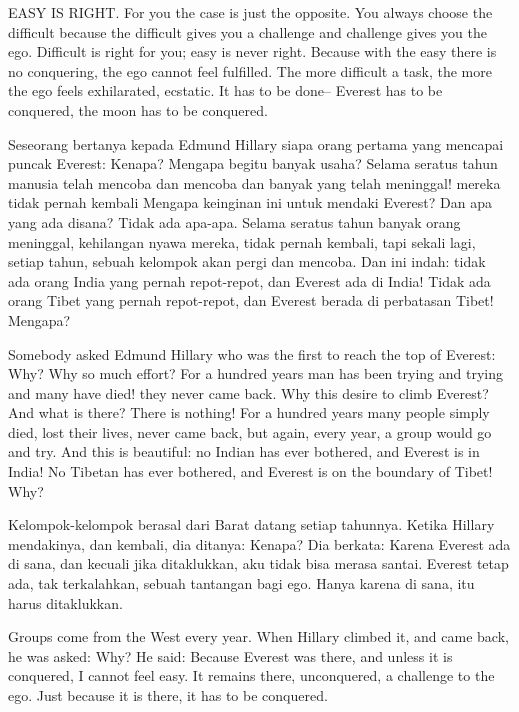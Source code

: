\english
EASY IS RIGHT. For you the case is just the opposite. You always choose the difficult because the difficult gives you a challenge and challenge gives you the ego. Difficult is right for you; easy is never right. Because with the easy there is no conquering, the ego cannot feel fulfilled. The more difficult a task, the more the ego feels exhilarated, ecstatic. It has to be done-- Everest has to be 
conquered, the moon has to be conquered.

\bahasa
Seseorang bertanya kepada Edmund Hillary siapa orang pertama yang mencapai puncak Everest: Kenapa? Mengapa begitu banyak usaha? Selama seratus tahun manusia telah mencoba dan mencoba dan banyak yang telah meninggal! mereka tidak pernah kembali Mengapa keinginan ini untuk mendaki Everest? Dan apa yang ada disana? Tidak ada apa-apa. Selama seratus tahun banyak orang meninggal, kehilangan nyawa mereka, tidak pernah kembali, tapi sekali lagi, setiap tahun, sebuah kelompok akan pergi dan mencoba. Dan ini indah: tidak ada orang India yang pernah repot-repot, dan Everest ada di India! Tidak ada orang Tibet yang pernah repot-repot, dan Everest berada di perbatasan Tibet! Mengapa?

\english
Somebody asked Edmund Hillary who was the first to reach the top of Everest: Why? Why so much effort? For a hundred years man has been trying and trying and many have died! they never came back. Why this desire to climb Everest? And what is there? There is nothing! For a hundred years many people simply died, lost their lives, never came back, but again, every year, a group would go and try. And this is beautiful: no Indian has ever bothered, and Everest is in India! No Tibetan has ever bothered, and Everest is on the boundary of Tibet! Why?

\bahasa
Kelompok-kelompok berasal dari Barat datang setiap tahunnya. Ketika Hillary mendakinya, dan kembali, dia ditanya: Kenapa? Dia berkata: Karena Everest ada di sana, dan kecuali jika ditaklukkan, aku tidak bisa merasa santai. Everest tetap ada, tak terkalahkan, sebuah tantangan bagi ego. Hanya karena di sana, itu harus ditaklukkan.

\english
Groups come from the West every year. When Hillary climbed it, and came back, he was asked: Why? He said: Because Everest was there, and unless it is conquered, I cannot feel easy. It remains there, unconquered, a challenge to the ego. Just because it is there, it has to be conquered.


